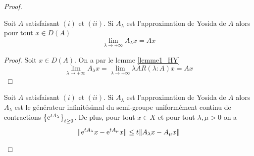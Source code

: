 \begin{proof}
    \begin{lemme}\label{lemme2_HY}
        Soit $A$ satisfaisant $(i)$ et $(ii)$. Si $A_{\lambda}$ est l'approximation de Yosida de $A$ alors pour tout $x \in D(A)$
        \begin{equation*}
            \lim_{\lambda \to +\infty} A_\lambda x=Ax
        \end{equation*}
    \end{lemme}

    \begin{proof}
        Soit $x \in D(A)$. On a par le lemme \ref{lemme1_HY}
        \begin{equation*}
            \lim_{\lambda \to +\infty}A_{\lambda}x = \lim_{\lambda \to +\infty}\lambda AR(\lambda : A)x=Ax
        \end{equation*}
    \end{proof}

    \begin{lemme}\label{lemme3_HY}
        Soit $A$ satisfaisant $(i)$ et $(ii)$. Si $A_{\lambda}$ est l'approximation de Yosida de $A$ alors $A_{\lambda}$ est le générateur infinitésimal du semi-groupe uniformément continu de contractions $\big\{\mathrm{e}^{tA_{\lambda}}\big\}_{t \geq 0}$. De plus, pour tout $x \in X$ et pour tout $\lambda,\mu >0$ on a 
        \begin{equation*}
            \|\mathrm{e}^{tA_{\lambda}}x-\mathrm{e}^{tA_{\mu}}x\| \leq t\|A_{\lambda}x-A_{\mu}x\|
        \end{equation*}
    \end{lemme}


\end{proof}
